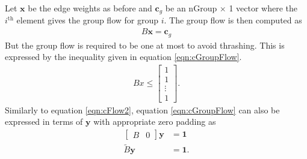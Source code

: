 Let $\mathbf{x}$ be the edge weights as before and $\mathbf{c}_g$ be an nGroup $\times$ 1 vector where the $i^{\text{th}}$ element gives the group flow for group $i$. The group flow is then computed as 
\begin{align}\label{eqn:cGroupFlow}
	B\mathbf{x} = \mathbf{c}_g
\end{align}
But the group flow is required to be one at most to avoid thrashing.  This is expressed by the inequality given in equation \ref{eqn:cGroupFlow}.
\begin{align}\label{eqn:cGroupFlow}
	Bx \le \begin{bmatrix} 1\\ 1 \\\vdots \\ 1\end{bmatrix}.
\end{align}
Similarly to equation \ref{eqn:cFlow2}, equation \ref{eqn:cGroupFlow} can also be expressed in terms of $\mathbf{y}$ with appropriate zero padding as
\begin{equation}\label{eqn:cGroupFlow2}
	\begin{aligned}
		\begin{bmatrix} B & 0\end{bmatrix} \mathbf{y} &= \mathbf{1} \\
		\tilde{B}\mathbf{y} &= \mathbf{1}.
	\end{aligned}
\end{equation}
